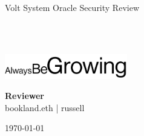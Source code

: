 \begin{titlepage}
  \vbox{}
  \vbox{}

  \begin{center}


    \noindent\makebox[\linewidth]{\rule{.7\paperwidth}{.6pt}}\\[0.7cm]

    { \huge \bfseries

      Volt System Oracle Security Review
    }\\[0.25cm]
    
    \noindent\makebox[\linewidth]{\rule{.7\paperwidth}{.6pt}}\\[0.7cm]

    
    \vfill

    \includegraphics[width=0.40\textwidth]{img/abg_wordmark.png}

    
    \large
    {\bfseries Reviewer}\\
    
    bookland.eth | russell 

    {\large \today}

  \end{center}

\end{titlepage}
